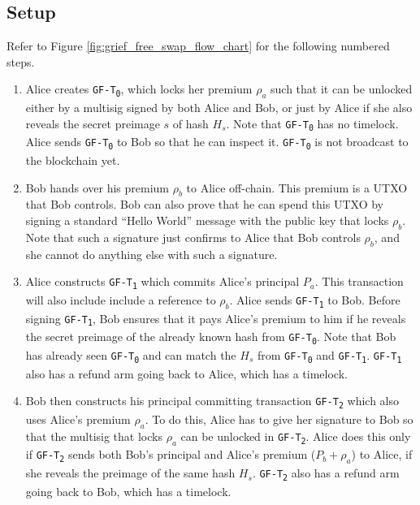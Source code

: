 \subsection{Setup}
Refer to Figure \ref{fig:grief_free_swap_flow_chart} for the following numbered steps.
\begin{enumerate}
    \item Alice creates \texttt{GF-T\textsubscript{0}}, which locks her premium $\rho_a$ such that it can be unlocked either by a multisig signed by both Alice and Bob, or just by Alice if she also reveals the secret preimage $s$ of hash $H_s$. Note that \texttt{GF-T\textsubscript{0}} has no timelock. Alice sends \texttt{GF-T\textsubscript{0}} to Bob so that he can inspect it. \texttt{GF-T\textsubscript{0}} is not broadcast to the blockchain yet.
    \item Bob hands over his premium $\rho_b$ to Alice off-chain. This premium is a UTXO that Bob controls. Bob can also prove that he can spend this UTXO by signing a standard ``Hello World'' message with the public key that locks $\rho_b$. Note that such a signature just confirms to Alice that Bob controls $\rho_b$, and she cannot do anything else with such a signature.
    \item Alice constructs \texttt{GF-T\textsubscript{1}} which commits Alice's principal $P_a$. This transaction will also include include a reference to $\rho_b$. Alice sends \texttt{GF-T\textsubscript{1}} to Bob. Before signing \texttt{GF-T\textsubscript{1}}, Bob ensures that it pays Alice's premium to him if he reveals the secret preimage of the already known hash from \texttt{GF-T\textsubscript{0}}. Note that Bob has already seen \texttt{GF-T\textsubscript{0}} and can match the $H_s$ from \texttt{GF-T\textsubscript{0}} and \texttt{GF-T\textsubscript{1}}. \texttt{GF-T\textsubscript{1}} also has a refund arm going back to Alice, which has a timelock. 
    \item Bob then constructs his principal committing transaction \texttt{GF-T\textsubscript{2}} which also uses Alice's premium $\rho_a$. To do this, Alice has to give her signature to Bob so that the multisig that locks $\rho_a$ can be unlocked in \texttt{GF-T\textsubscript{2}}. Alice does this only if \texttt{GF-T\textsubscript{2}} sends both Bob's principal and Alice's premium ($P_b + \rho_a$) to Alice, if she reveals the preimage of the same hash $H_s$. \texttt{GF-T\textsubscript{2}} also has a refund arm going back to Bob, which has a timelock. 
\end{enumerate} 

